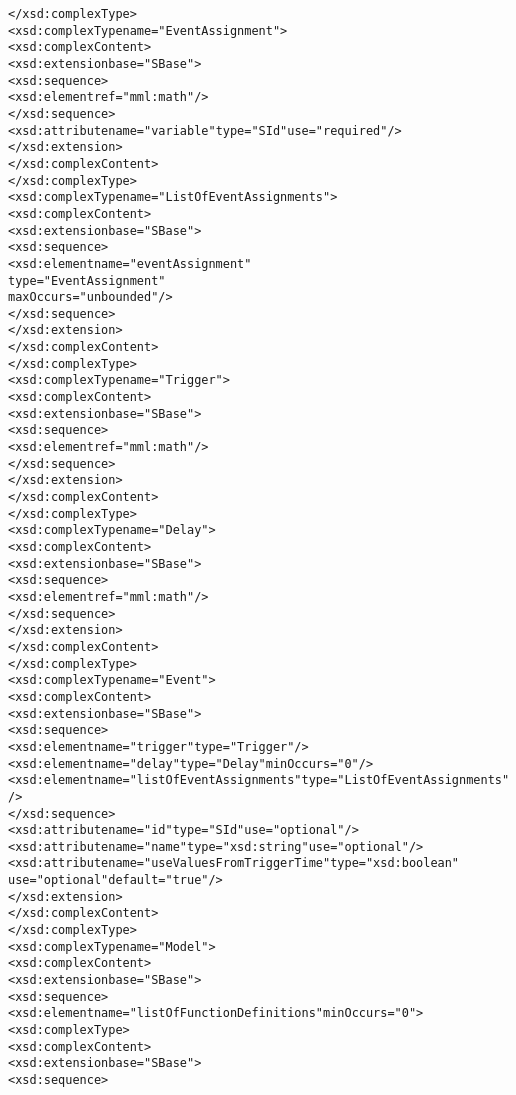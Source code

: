 \begin{alltt}
    </xsd:complexType>
    <xsd:complexType name="EventAssignment">
        <xsd:complexContent>
            <xsd:extension base="SBase">
                <xsd:sequence>
                    <xsd:element ref="mml:math"/>
                </xsd:sequence>
                <xsd:attribute name="variable" type="SId" use="required"/>
            </xsd:extension>
        </xsd:complexContent>
    </xsd:complexType>
    <xsd:complexType name="ListOfEventAssignments">
        <xsd:complexContent>
            <xsd:extension base="SBase">
                <xsd:sequence>
                    <xsd:element name="eventAssignment"
                                 type="EventAssignment" 
                                 maxOccurs="unbounded"/>
                </xsd:sequence>
            </xsd:extension>
        </xsd:complexContent>
    </xsd:complexType>
    <xsd:complexType name="Trigger">
        <xsd:complexContent>
            <xsd:extension base="SBase">
                <xsd:sequence>
                    <xsd:element ref="mml:math"/>
                </xsd:sequence>
            </xsd:extension>
        </xsd:complexContent>
    </xsd:complexType>
    <xsd:complexType name="Delay">
        <xsd:complexContent>
            <xsd:extension base="SBase">
                <xsd:sequence>
                    <xsd:element ref="mml:math"/>
                </xsd:sequence>
            </xsd:extension>
        </xsd:complexContent>
    </xsd:complexType>
    <xsd:complexType name="Event">
        <xsd:complexContent>
            <xsd:extension base="SBase">
                <xsd:sequence>
                    <xsd:element name="trigger" type="Trigger"/>
                    <xsd:element name="delay" type="Delay" minOccurs="0"/>
                    <xsd:element name="listOfEventAssignments" type="ListOfEventAssignments"/>
                </xsd:sequence>
                <xsd:attribute name="id" type="SId" use="optional"/>
                <xsd:attribute name="name" type="xsd:string" use="optional"/>
                <xsd:attribute name="useValuesFromTriggerTime" type="xsd:boolean" 
                               use="optional" default="true"/>
            </xsd:extension>
        </xsd:complexContent>
    </xsd:complexType>
    <xsd:complexType name="Model">
        <xsd:complexContent>
            <xsd:extension base="SBase">
                <xsd:sequence>
                    <xsd:element name="listOfFunctionDefinitions" minOccurs="0">
                        <xsd:complexType>
                            <xsd:complexContent>
                                <xsd:extension base="SBase">
                                    <xsd:sequence>

\end{alltt}
